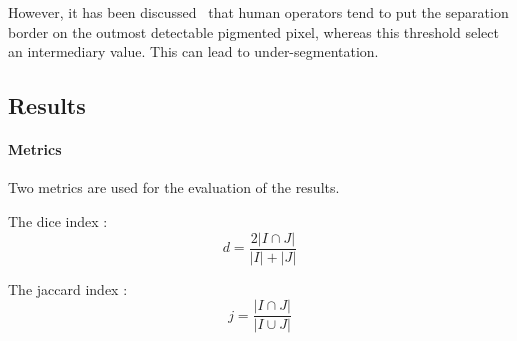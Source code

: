\documentclass[a4paper,10pt]{article}
\begin{document}
However, it has been discussed~\cite{celebi_lesion_2009} that human operators tend to put the separation border on the outmost detectable pigmented pixel, whereas this threshold select an intermediary value. This can lead to under-segmentation. 



\subsection{Results} \label{results-otsu}

\paragraph{Metrics}
Two metrics are used for the evaluation of the results.

The dice index :
\begin{equation} \label{eq:dice}
d=\frac{2|I \cap J|}{|I| + |J|} 
\end{equation}

The jaccard index :
\begin{equation} \label{eq:jaccard}
j=\frac{|I \cap J|}{|I \cup J|} 
\end{equation}
\end{document}
